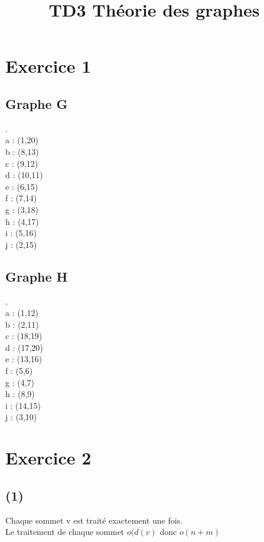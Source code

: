 \documentclass{article}
\title{TD3 Théorie des graphes}
\author{}
\date{}
\begin{document}
\maketitle{}
\section*{Exercice 1}
\subsection*{Graphe G}
. \\
a : (1,20) \\
b : (8,13) \\
c : (9,12) \\
d : (10,11) \\
e : (6,15) \\
f : (7,14) \\
g : (3,18) \\
h : (4,17) \\
i : (5,16) \\
j : (2,15) \\
\subsection*{Graphe H}
. \\
a : (1,12) \\
b : (2,11) \\
c : (18,19) \\
d : (17,20) \\
e : (13,16) \\
f : (5,6) \\
g : (4,7) \\
h : (8,9) \\
i : (14,15) \\
j : (3,10) 

\section*{Exercice 2}
\subsection*{(1)}
Chaque sommet v est traité exactement une fois. \\
Le traitement de chaque sommet $o(d(v)$ donc $o(n+m)$
\newpage
\end{document}
